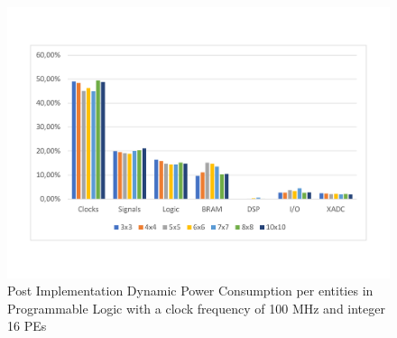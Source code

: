 \begin{figure}[!htbp]
\centering
\captionsetup{justification=centering}
\includegraphics[scale=0.6,angle=0]{./figure/graphs/power_pldyn_div_int16_freq_100mhz.pdf}
\caption{Post Implementation Dynamic Power Consumption per entities in Programmable Logic with a clock frequency of 100 MHz and integer 16 PEs}
\label{fig:dynpowint16ent100}
\end{figure}


